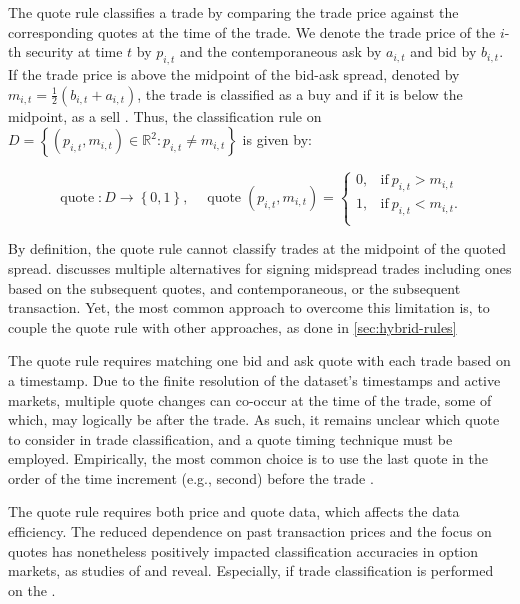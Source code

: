 The quote rule classifies a trade by comparing the trade price against the corresponding quotes at the time of the trade. We denote the trade price of the $i$-th security at time $t$ by $p_{i,t}$ and the contemporaneous ask by $a_{i,t}$ and bid by $b_{i,t}$. If the trade price is above the midpoint of the bid-ask spread, denoted by $m_{i,t} = \tfrac{1}{2}(b_{i,t} + a_{i,t})$, the trade is classified as a buy and if it is below the midpoint, as a sell \autocite[][41]{harrisDayEndTransactionPrice1989}. Thus, the classification rule on $D = \left\{(p_{i,t}, m_{i,t}) \in \mathbb{R}^2: p_{i,t} \neq m_{i,t}\right\}$ is given by:

\begin{equation}
  \operatorname{quote}\colon D \to \left\{0, 1\right\},\quad
  \operatorname{quote}(p_{i,t}, m_{i,t})=
  \begin{cases}
    0, & \text{if}\ p_{i, t}>m_{i, t}  \\
    1, & \text{if}\ p_{i, t}<m_{i, t}. \\
  \end{cases}
\end{equation}

By definition, the quote rule cannot classify trades at the midpoint of the quoted spread. \textcite[][241]{hasbrouckTradesQuotesInventories1988} discusses multiple alternatives for signing midspread trades including ones based on the subsequent quotes, and contemporaneous, or the subsequent transaction. Yet, the most common approach to overcome this limitation is, to couple the quote rule with other approaches, as done in \cref{sec:hybrid-rules}

The quote rule requires matching one bid and ask quote with each trade based on a timestamp. Due to the finite resolution of the dataset's timestamps and active markets, multiple quote changes can co-occur at the time of the trade, some of which, may logically be after the trade. As such, it remains unclear which quote to consider in trade classification, and a quote timing technique must be employed. Empirically, the most common choice is to use the last quote in the order of the time increment (e.g., second) before the trade \autocite[][1765]{holdenLiquidityMeasurementProblems2014}.

The quote rule requires both price and quote data, which affects the data efficiency. The reduced dependence on past transaction prices and the focus on quotes has nonetheless positively impacted classification accuracies in option markets, as studies of \textcite[][886]{savickasInferringDirectionOption2003} and \textcite[][3]{grauerOptionTradeClassification2022} reveal. Especially, if trade classification is performed on the .


